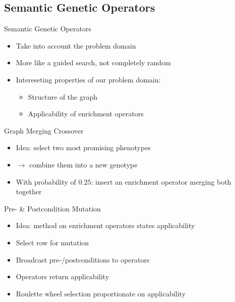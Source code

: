 \documentclass[aspectratio=1610,table]{beamer}
\begin{document}
\subsection{Semantic Genetic Operators}

\begin{frame}{Semantic Genetic Operators}
  \begin{itemize}[<+->]
    \item Take into account the problem domain
    \item More like a guided search, not completely random
    \item Intereseting properties of our problem domain:
    \begin{itemize}
      \item Structure of the graph
      \item Applicability of enrichment operators
    \end{itemize}

  \end{itemize}
\end{frame}


\begin{frame}{Graph Merging Crossover}
  \begin{itemize}[<+->]
    \item Idea: select two most promising phenotypes
    \item $\to$ combine them into a new genotype
    \item With probability of $0.25$: insert an enrichment operator merging both together
  \end{itemize}
\end{frame}


\begin{frame}{Pre- \& Postcondition Mutation}
  \begin{itemize}[<+->]
    \item Idea: method on enrichment operators states applicability
    \item Select row for mutation
    \item Broadcast pre-/postconditions to operators
    \item Operators return applicability
    \item Roulette wheel selection proportionate on applicability
  \end{itemize}
\end{frame}
\end{document}
